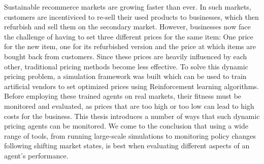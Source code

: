 Sustainable recommerce markets are growing faster than ever. In such markets, customers are incentiviced to re-sell their used products to businesses, which then refurbish and sell them on the secondary market. However, businesses now face the challenge of having to set three different prices for the same item: One price for the new item, one for its refurbished version and the price at which items are bought back from customers. Since these prices are heavily influenced by each other, traditional pricing methods become less effective. To solve this dynamic pricing problem, a simulation framework was built which can be used to train artificial vendors to set optimized prices using Reinforcement learning algorithms.
Before employing these trained agents on real markets, their fitness must be monitored and evaluated, as prices that are too high or too low can lead to high costs for the business. This thesis introduces a number of ways that such dynamic pricing agents can be monitored. We come to the conclusion that using a wide range of tools, from running large-scale simulations to monitoring policy changes following shifting market states, is best when evaluating different aspects of an agent's performance.